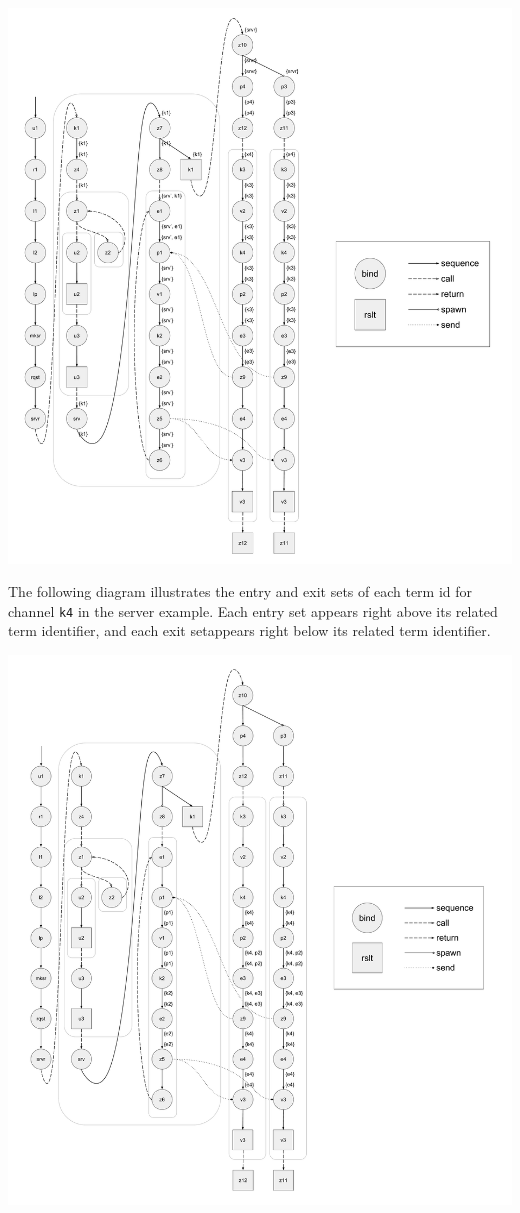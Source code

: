\documentclass[letterpaper, 11pt]{extarticle}
\begin{document}
\includegraphics[width=1\textwidth]{cml-liveness-analysis-k1.pdf}

The following diagram illustrates the entry and exit sets of each term id
for channel \lstinline{k4} in
the server example.  Each entry set appears right above its related term identifier,
and each exit setappears right below its related term identifier. 

\includegraphics[width=1\textwidth]{cml-liveness-analysis-k4.pdf}
\end{document}
